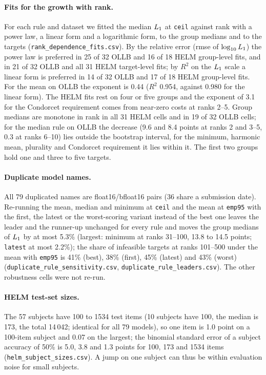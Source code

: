 \paragraph{Fits for the growth with rank.}
For each rule and dataset we fitted the median $L_1$ at \texttt{ceil} against rank with a power law, a linear form and a logarithmic form, to the group medians and to the targets (\texttt{rank\_dependence\_fits.csv}). By the relative error (rmse of $\log_{10}L_1$) the power law is preferred in 25 of 32 OLLB and 16 of 18 HELM group-level fits, and in 21 of 32 OLLB and all 31 HELM target-level fits; by $R^2$ on the $L_1$ scale a linear form is preferred in 14 of 32 OLLB and 17 of 18 HELM group-level fits. For the mean on OLLB the exponent is 0.44 ($R^2$ 0.954, against 0.980 for the linear form). The HELM fits rest on four or five groups and the exponent of 3.1 for the Condorcet requirement comes from near-zero costs at ranks 2--5. Group medians are monotone in rank in all 31 HELM cells and in 19 of 32 OLLB cells; for the median rule on OLLB the decrease (9.6 and 8.4 points at ranks 2 and 3--5, 0.3 at ranks 6--10) lies outside the bootstrap interval, for the minimum, harmonic mean, plurality and Condorcet requirement it lies within it. The first two groups hold one and three to five targets.

\paragraph{Duplicate model names.}
All 79 duplicated names are float16/bfloat16 pairs (36 share a submission date). Re-running the mean, median and minimum at \texttt{ceil} and the mean at \texttt{emp95} with the first, the latest or the worst-scoring variant instead of the best one leaves the leader and the runner-up unchanged for every rule and moves the group medians of $L_1$ by at most 5.3\% (largest: minimum at ranks 31--100, 13.8 to 14.5 points; \texttt{latest} at most 2.2\%); the share of infeasible targets at ranks 101--500 under the mean with \texttt{emp95} is 41\% (best), 38\% (first), 45\% (latest) and 43\% (worst) (\texttt{duplicate\_rule\_sensitivity.csv}, \texttt{duplicate\_rule\_leaders.csv}). The other robustness cells were not re-run.

\paragraph{HELM test-set sizes.}
The 57 subjects have 100 to 1534 test items (10 subjects have 100, the median is 173, the total 14\,042; identical for all 79 models), so one item is 1.0 point on a 100-item subject and 0.07 on the largest; the binomial standard error of a subject accuracy of 50\% is 5.0, 3.8 and 1.3 points for 100, 173 and 1534 items (\texttt{helm\_subject\_sizes.csv}). A jump on one subject can thus be within evaluation noise for small subjects.

